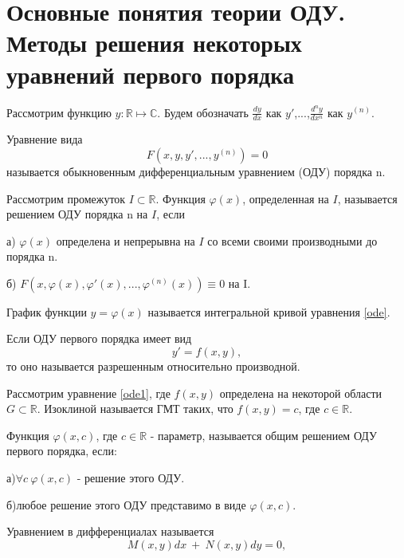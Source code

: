 \documentclass[document.tex]{subfiles}
\begin{document}
\section{Основные понятия теории ОДУ. Методы решения некоторых уравнений первого порядка}
Рассмотрим функцию $y:\mathbb{R}\mapsto\mathbb{C}$. Будем обозначать $\frac{dy}{dx}$ как $y'$,...,$\frac{d^ny}{dx^n}$ как $y^{(n)}$.
\begin{definition}
Уравнение вида
\begin{equation}
F(x,y,y',...,y^{(n)})=0 
\label{ode}
\end{equation}  называется обыкновенным дифференциальным уравнением (ОДУ) порядка n.
\end{definition}
\begin{definition}
Рассмотрим промежуток $I \subset \mathbb{R}$. Функция $\varphi(x)$, определенная на $I$, называется решением ОДУ порядка n на $I$, если


а) $\varphi(x)$ определена и непрерывна  на $I$ со всеми своими производными до порядка n.


б) $F(x,\varphi(x),\varphi'(x),...,\varphi^{(n)}(x))\equiv0$ на I.
\end{definition}
\begin{definition}
График функции $y=\varphi(x)$ называется интегральной кривой уравнения \ref{ode}.
\end{definition}
Если ОДУ первого порядка имеет вид 
\begin{equation}
y'=f(x,y), \label{ode1}
\end{equation}то оно называется разрешенным относительно производной.
\begin{definition}
Рассмотрим уравнение \ref{ode1}, где $f(x,y)$ определена на некоторой области $G \subset \mathbb{R}$. Изоклиной называется ГМТ таких, что $f(x,y)=c$, где $c \in \mathbb{R}$.
\end{definition}
\begin{definition}
Функция $\varphi(x,c)$, где $c \in \mathbb{R}$ - параметр, называется общим решением ОДУ первого порядка, если:

а)$\forall c\ \varphi(x,c)$ - решение этого ОДУ.

б)любое решение этого ОДУ представимо в виде $\varphi(x,c)$.
\end{definition}
\begin{definition}
Уравнением в дифференциалах называется 
\begin{equation}
M(x,y)dx\ +\ N(x,y)dy=0, \label{odedif} 
\end{equation}
\end{definition}
\end{document}
